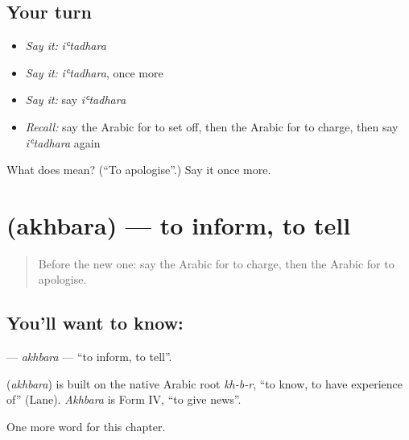 \subsection*{Your turn}
\begin{itemize}
\raggedright
  \item \emph{Say it:} \emph{iʿtadhara}
  \item \emph{Say it:} \emph{iʿtadhara}, once more
  \item \emph{Say it:} say \emph{iʿtadhara}
  \item \emph{Recall:} say the Arabic for to set off, then the Arabic for to charge, then say \emph{iʿtadhara} again
\end{itemize}

\begin{tcolorbox}[breakable,colback=teal!4,colframe=teal!35!black,title={Before you move on}]
What does  mean? (\textquotedblleft{}To apologise\textquotedblright{}.) Say it once more.
\end{tcolorbox}
\section[\texorpdfstring{\ar{أخبر} (akhbara)}{أخبر (akhbara)}]{ (akhbara) — to inform, to tell}

\label{lesson:AR-C226-akhbara}



\begin{quote}
Before the new one: say the Arabic for to charge, then the Arabic for to apologise.
\end{quote}

\subsection*{You'll want to know: }
\textbf{} — \emph{akhbara} — \textquotedblleft{}to inform, to tell\textquotedblright{}.

\begin{cousinweb}
\textbf{} (\emph{akhbara}) is built on the native Arabic root \emph{kh-b-r}, \textquotedblleft{}to know, to have experience of\textquotedblright{} (Lane). \emph{Akhbara} is Form IV, \textquotedblleft{}to give news\textquotedblright{}.
\end{cousinweb}

\begin{grammarlens}[title={What you've built}]
One more word for this chapter.
\end{grammarlens}

